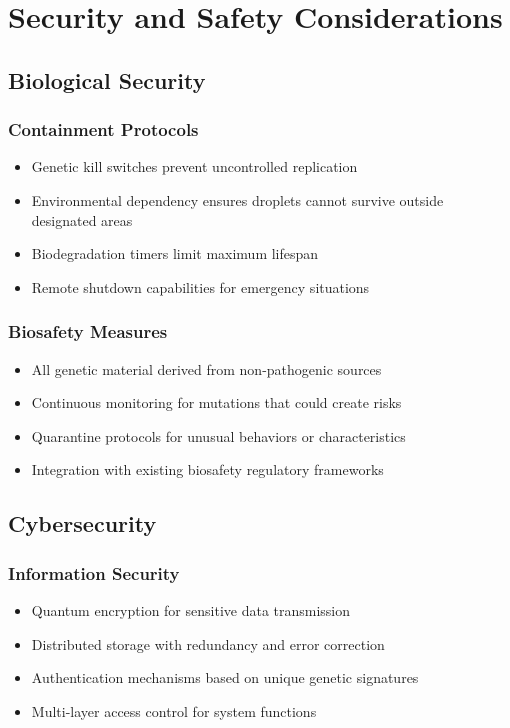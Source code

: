 \documentclass[11pt,a4paper]{article}
\begin{document}
\section{Security and Safety Considerations}

\subsection{Biological Security}

\subsubsection{Containment Protocols}
\begin{itemize}
    \item Genetic kill switches prevent uncontrolled replication
    \item Environmental dependency ensures droplets cannot survive outside designated areas
    \item Biodegradation timers limit maximum lifespan
    \item Remote shutdown capabilities for emergency situations
\end{itemize}

\subsubsection{Biosafety Measures}
\begin{itemize}
    \item All genetic material derived from non-pathogenic sources
    \item Continuous monitoring for mutations that could create risks
    \item Quarantine protocols for unusual behaviors or characteristics
    \item Integration with existing biosafety regulatory frameworks
\end{itemize}

\subsection{Cybersecurity}

\subsubsection{Information Security}
\begin{itemize}
    \item Quantum encryption for sensitive data transmission
    \item Distributed storage with redundancy and error correction
    \item Authentication mechanisms based on unique genetic signatures
    \item Multi-layer access control for system functions
\end{itemize}
\end{document}
